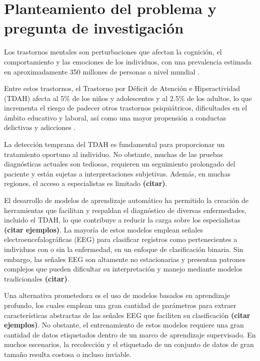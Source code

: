 \section{Planteamiento del problema y pregunta de investigación}


Los trastornos mentales son perturbaciones que afectan la cognición, el comportamiento y las emociones de los individuos, con una prevalencia estimada en aproximadamente 350 millones de personas a nivel mundial \cite{Dehghan-Bonari2023}.  

Entre estos trastornos, el Trastorno por Déficit de Atención e Hiperactividad (TDAH) afecta al 5\% de los niños y adolescentes y al 2.5\% de los adultos, lo que incrementa el riesgo de padecer otros trastornos psiquiátricos, dificultades en el ámbito educativo y laboral, así como una mayor propensión a conductas delictivas y adicciones \cite{Faraone2015}.  

La detección temprana del TDAH es fundamental para proporcionar un tratamiento oportuno al individuo. No obstante, muchas de las pruebas diagnósticas actuales son tediosas, requieren un seguimiento prolongado del paciente y están sujetas a interpretaciones subjetivas. Además, en muchas regiones, el acceso a especialistas es limitado \textbf{(citar)}.  

El desarrollo de modelos de aprendizaje automático ha permitido la creación de herramientas que facilitan y respaldan el diagnóstico de diversas enfermedades, incluido el TDAH, lo que contribuye a reducir la carga sobre los especialistas \textbf{(citar ejemplos)}. La mayoría de estos modelos emplean señales electroencefalográficas (EEG) para clasificar registros como pertenecientes a individuos con o sin la enfermedad, en un enfoque de clasificación binaria. Sin embargo, las señales EEG son altamente no estacionarias y presentan patrones complejos que pueden dificultar su interpretación y manejo mediante modelos tradicionales \textbf{(citar)}.  

Una alternativa prometedora es el uso de modelos basados en aprendizaje profundo, los cuales emplean una gran cantidad de parámetros para extraer características abstractas de las señales EEG que faciliten su clasificación \textbf{(citar ejemplos)}. No obstante, el entrenamiento de estos modelos requiere una gran cantidad de datos etiquetados dentro de un marco de aprendizaje supervisado. En muchos escenarios, la recolección y el etiquetado de un conjunto de datos de gran tamaño resulta costosa o incluso inviable.  

